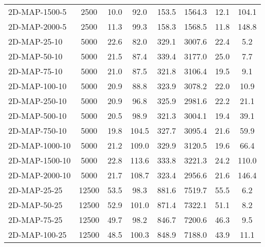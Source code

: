 \documentclass{article}
\begin{document}
\begin{center}
\begin{table}[h]
\begin{tabular}{|l||c|c|c|c|c|c|c|}
            2D-MAP-1500-5                  & 2500  & 10.0      & 92.0       & 153.5       & 1564.3   & 12.1      & 104.1      \\
            2D-MAP-2000-5                  & 2500  & 11.3      & 99.3       & 158.3       & 1568.5   & 11.8      & 148.8      \\
            \hline
            2D-MAP-25-10                   & 5000  & 22.6      & 82.0       & 329.1       & 3007.6   & 22.4      & 5.2        \\
            2D-MAP-50-10                   & 5000  & 21.5      & 87.4       & 339.4       & 3177.0   & 25.0      & 7.7        \\
            2D-MAP-75-10                   & 5000  & 21.0      & 87.5       & 321.8       & 3106.4   & 19.5      & 9.1        \\
            2D-MAP-100-10                  & 5000  & 20.9      & 88.8       & 323.9       & 3078.2   & 22.0      & 10.9       \\
            2D-MAP-250-10                  & 5000  & 20.9      & 96.8       & 325.9       & 2981.6   & 22.2      & 21.1       \\
            2D-MAP-500-10                  & 5000  & 20.5      & 98.9       & 321.3       & 3004.1   & 19.4      & 39.1       \\
            2D-MAP-750-10                  & 5000  & 19.8      & 104.5      & 327.7       & 3095.4   & 21.6      & 59.9       \\
            2D-MAP-1000-10                 & 5000  & 21.2      & 109.0      & 329.9       & 3120.5   & 19.6      & 66.4       \\
            2D-MAP-1500-10                 & 5000  & 22.8      & 113.6      & 333.8       & 3221.3   & 24.2      & 110.0      \\
            2D-MAP-2000-10                 & 5000  & 21.7      & 108.7      & 323.4       & 2956.6   & 21.6      & 146.4      \\
            \hline
            2D-MAP-25-25                   & 12500 & 53.5      & 98.3       & 881.6       & 7519.7   & 55.5      & 6.2        \\
            2D-MAP-50-25                   & 12500 & 52.9      & 101.0      & 871.4       & 7322.1   & 51.1      & 8.2        \\
            2D-MAP-75-25                   & 12500 & 49.7      & 98.2       & 846.7       & 7200.6   & 46.3      & 9.5        \\
            2D-MAP-100-25                  & 12500 & 48.5      & 100.3      & 848.9       & 7188.0   & 43.9      & 11.1       \\

\end{tabular}
\end{table}
\end{center}
\end{document}

